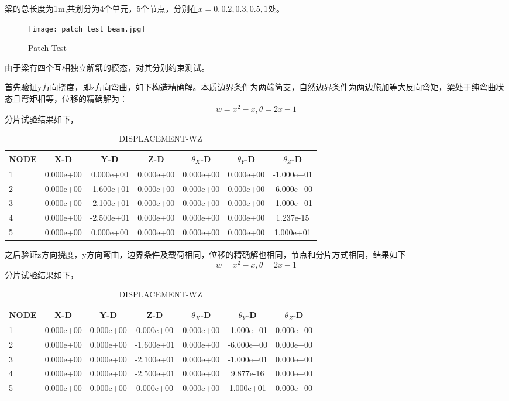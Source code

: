 \documentclass[forprint]{WHUBachelor}
\begin{document}
梁的总长度为1m,共划分为4个单元，5个节点，分别在$x=0,0.2,0.3,0.5,1$处。
\begin{figure}[H]
\centering
    \texttt{[image: patch\_test\_beam.jpg]}
  \caption{Patch Test}
\end{figure}
由于梁有四个互相独立解耦的模态，对其分别约束测试。\par
首先验证y方向挠度，即z方向弯曲，如下构造精确解。本质边界条件为两端简支，自然边界条件为两边施加等大反向弯矩，梁处于纯弯曲状态且弯矩相等，位移的精确解为：
\begin{equation} 
w= x^{2}- x, \theta=2 x-1
 \end{equation}
分片试验结果如下，
\begin{table}[H]
  \centering
  \caption{DISPLACEMENT-WZ}
    \begin{tabular}{lcccccc}
\hline
NODE & X-D&Y-D &Z-D &$\theta_X$-D &$\theta_Y$-D&$\theta_Z$-D \\
\hline
1 & 0.000e+00 & 0.000e+00 & 0.000e+00 & 0.000e+00 & 0.000e+00 & -1.000e+01 \\
2 & 0.000e+00 & -1.600e+01 & 0.000e+00 & 0.000e+00 & 0.000e+00 & -6.000e+00 \\
3 & 0.000e+00 & -2.100e+01 & 0.000e+00 & 0.000e+00 & 0.000e+00 & -1.000e+01 \\
4 & 0.000e+00 & -2.500e+01 & 0.000e+00 & 0.000e+00 & 0.000e+00 & 1.237e-15 \\
5 & 0.000e+00 & 0.000e+00 & 0.000e+00 & 0.000e+00 & 0.000e+00 & 1.000e+01 \\
\hline
 \end{tabular}%
\end{table}
之后验证z方向挠度，y方向弯曲，边界条件及载荷相同，位移的精确解也相同，节点和分片方式相同，结果如下
\begin{equation} 
w= x^{2}- x, \theta=2 x-1
 \end{equation}
分片试验结果如下，
\begin{table}[H]
  \centering
  \caption{DISPLACEMENT-WZ}
    \begin{tabular}{lcccccc}
\hline
NODE & X-D&Y-D &Z-D &$\theta_X$-D &$\theta_Y$-D&$\theta_Z$-D \\
\hline
1 & 0.000e+00 & 0.000e+00 & 0.000e+00 & 0.000e+00  & -1.000e+01 & 0.000e+00\\
2 & 0.000e+00 &0.000e+00 &  -1.600e+01 & 0.000e+00  & -6.000e+00& 0.000e+00 \\
3 & 0.000e+00 & 0.000e+00 & -2.100e+01 & 0.000e+00 & -1.000e+01 & 0.000e+00 \\
4 & 0.000e+00 & 0.000e+00 & -2.500e+01 & 0.000e+00  & 9.877e-16 & 0.000e+00\\
5 & 0.000e+00 & 0.000e+00 & 0.000e+00 & 0.000e+00  & 1.000e+01 & 0.000e+00\\
\hline
 \end{tabular}%
\end{table}
\end{document}
